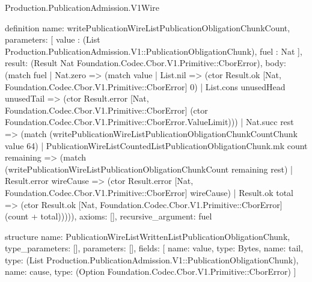 \begin{lexlean}{Production.PublicationAdmission.V1Wire}
\begin{semanticmodule}
definition{
  name: writePublicationWireListPublicationObligationChunkCount,
  parameters: [
    value : (List Production.PublicationAdmission.V1::PublicationObligationChunk),
    fuel : Nat
  ],
  result: (Result Nat Foundation.Codec.Cbor.V1.Primitive::CborError),
  body: (match fuel
    | Nat.zero => (match value
      | List.nil => (ctor Result.ok [Nat, Foundation.Codec.Cbor.V1.Primitive::CborError] 0)
      | List.cons unusedHead unusedTail => (ctor Result.error [Nat, Foundation.Codec.Cbor.V1.Primitive::CborError] (ctor Foundation.Codec.Cbor.V1.Primitive::CborError.ValueLimit)))
    | Nat.succ rest => (match (writePublicationWireListPublicationObligationChunkCountChunk value 64)
      | PublicationWireListCountedListPublicationObligationChunk.mk count remaining => (match (writePublicationWireListPublicationObligationChunkCount remaining rest)
        | Result.error wireCause => (ctor Result.error [Nat, Foundation.Codec.Cbor.V1.Primitive::CborError] wireCause)
        | Result.ok total => (ctor Result.ok [Nat, Foundation.Codec.Cbor.V1.Primitive::CborError] (count + total))))),
  axioms: [],
  recursive_argument: fuel
}

structure{
  name: PublicationWireListWrittenListPublicationObligationChunk,
  type_parameters: [],
  parameters: [],
  fields: [
    {name: value, type: Bytes},
    {name: tail, type: (List Production.PublicationAdmission.V1::PublicationObligationChunk)},
    {name: cause, type: (Option Foundation.Codec.Cbor.V1.Primitive::CborError)}
  ]
}


\end{semanticmodule}
\end{lexlean}
